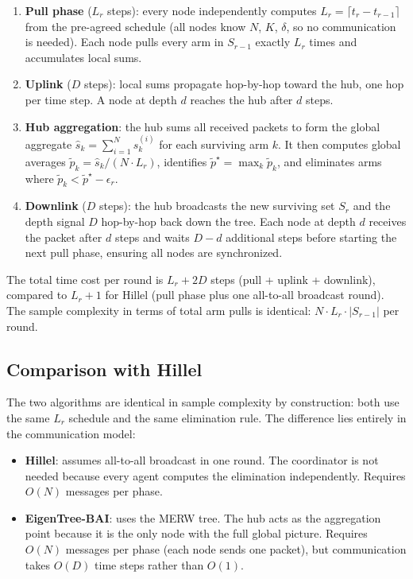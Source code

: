 \documentclass{article}
\newcommand{\merw}{EigenTree}
\begin{document}
\begin{enumerate}
    \item \textbf{Pull phase} ($L_r$ steps): every node independently computes $L_r = \lceil t_r - t_{r-1} \rceil$ from the pre-agreed schedule (all nodes know $N$, $K$, $\delta$, so no communication is needed). Each node pulls every arm in $S_{r-1}$ exactly $L_r$ times and accumulates local sums.

    \item \textbf{Uplink} ($D$ steps): local sums propagate hop-by-hop toward the hub, one hop per time step. A node at depth $d$ reaches the hub after $d$ steps.

    \item \textbf{Hub aggregation}: the hub sums all received packets to form the global aggregate $\hat{s}_k = \sum_{i=1}^N s_k^{(i)}$ for each surviving arm $k$. It then computes global averages $\tilde{p}_k = \hat{s}_k / (N \cdot L_r)$, identifies $\tilde{p}^\star = \max_k \tilde{p}_k$, and eliminates arms where $\tilde{p}_k < \tilde{p}^\star - \epsilon_r$.

    \item \textbf{Downlink} ($D$ steps): the hub broadcasts the new surviving set $S_r$ and the depth signal $D$ hop-by-hop back down the tree. Each node at depth $d$ receives the packet after $d$ steps and waits $D - d$ additional steps before starting the next pull phase, ensuring all nodes are synchronized.
\end{enumerate}

The total time cost per round is $L_r + 2D$ steps (pull + uplink + downlink), compared to $L_r + 1$ for Hillel (pull phase plus one all-to-all broadcast round). The sample complexity in terms of total arm pulls is identical: $N \cdot L_r \cdot |S_{r-1}|$ per round.

\subsection{Comparison with Hillel}

The two algorithms are identical in sample complexity by construction: both use the same $L_r$ schedule and the same elimination rule. The difference lies entirely in the communication model:

\begin{itemize}
    \item \textbf{Hillel}: assumes all-to-all broadcast in one round. The coordinator is not needed because every agent computes the elimination independently. Requires $O(N)$ messages per phase.
    \item \textbf{\merw-BAI}: uses the MERW tree. The hub acts as the aggregation point because it is the only node with the full global picture. Requires $O(N)$ messages per phase (each node sends one packet), but communication takes $O(D)$ time steps rather than $O(1)$.
\end{itemize}
\end{document}
